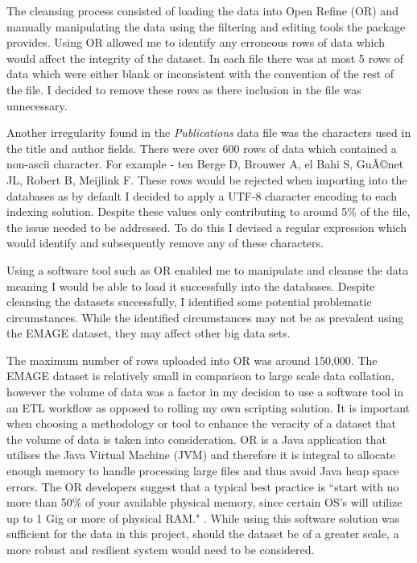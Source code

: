 The cleansing process consisted of loading the data into Open Refine (OR) and manually manipulating the data using the filtering and editing tools the package provides. Using OR allowed me to identify any erroneous rows of data which would affect the integrity of the dataset. In each file there was at most 5 rows of data which were either blank or inconsistent with the convention of the rest of the file. I decided to remove these rows as there inclusion in the file was unnecessary.

Another irregularity found in the \textit{Publications} data file was the characters used in the title and author fields. There were over 600 rows of data which contained a non-ascii character. For example - ten Berge D, Brouwer A, el Bahi S, GuÃ©net JL, Robert B, Meijlink F. These rows would be rejected when importing into the databases as by default I decided to apply a UTF-8 character encoding to each indexing solution. Despite these values only contributing to around 5\% of the file, the issue needed to be addressed. To do this I devised a regular expression which would identify and subsequently remove any of these characters.

Using a software tool such as OR enabled me to manipulate and cleanse the data meaning I would be able to load it successfully into the databases. Despite cleansing the datasets successfully, I identified some potential problematic circumstances. While the identified circumstances may not be as prevalent using the EMAGE dataset, they may affect other big data sets.

The maximum number of rows uploaded into OR was around 150,000. The EMAGE dataset is relatively small in comparison to large scale data collation, however the volume of data was a factor in my decision to use a software tool in an ETL workflow as opposed to rolling my own scripting solution. It is important when choosing a methodology or tool to enhance the veracity of a dataset that the volume of data is taken into consideration. OR is a Java application that utilises the Java Virtual Machine (JVM) and therefore it is integral to allocate enough memory to handle processing large files and thus avoid Java heap space errors. The OR developers suggest that a typical best practice is ``start with no more than 50\% of your available physical memory, since certain OS's will utilize up to 1 Gig or more of physical RAM." \cite{googref}. While using this software solution was sufficient for the data in this project, should the dataset be of a greater scale, a more robust and resilient system would need to be considered.

